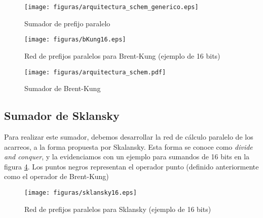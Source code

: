 \begin{figure}[h]
  \centering
\texttt{[image: figuras/arquitectura\_schem\_generico.eps]}
  \caption{Sumador de prefijo paralelo}
  \label{fig:ppadder}
\end{figure}

\begin{figure}[h!]
\vspace{-5pt}
  \centering
\texttt{[image: figuras/bKung16.eps]}
  \caption{Red de prefijos paralelos para Brent-Kung (ejemplo de 16 bits)}
\label{bKung16}
\vspace{-10pt}
\end{figure}

\begin{figure}[h]
  \centering
\texttt{[image: figuras/arquitectura\_schem.pdf]}
  \caption{Sumador de Brent-Kung}
  \label{fig:bkungadder}
\end{figure}

\subsection{Sumador de Sklansky}\label{subsec:sklansky}
Para realizar este sumador, debemos desarrollar la red de cálculo paralelo de los acarreos, a la forma propuesta por Skalansky. Esta forma se conoce como \emph{divide and conquer}, y la evidenciamos con un ejemplo para sumandos de 16 bits en la figura \ref{fig:sklansky16}. Los puntos negros representan el operador punto (definido anteriormente como el operador de Brent-Kung)

\begin{figure}[h!]
\vspace{-5pt}
  \centering
\texttt{[image: figuras/sklansky16.eps]}
  \caption{Red de prefijos paralelos para Sklansky (ejemplo de 16 bits)}
\label{fig:sklansky16}
\vspace{-10pt}
\end{figure}
